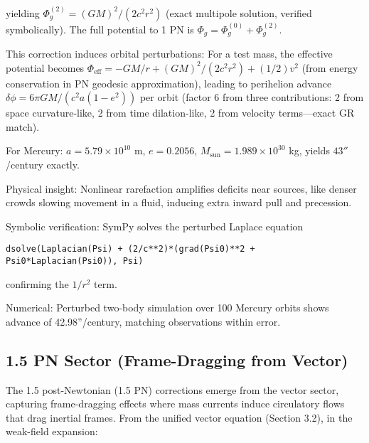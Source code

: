 yielding $\Phi_g^{(2)} = (G M)^2 / (2 c^2 r^2)$ (exact multipole solution, verified symbolically). The full potential to 1 PN is $\Phi_g = \Phi_g^{(0)} + \Phi_g^{(2)}$.

This correction induces orbital perturbations: For a test mass, the effective potential becomes $\Phi_{\text{eff}} = -G M / r + (G M)^2 / (2 c^2 r^2) + (1/2) v^2$ (from energy conservation in PN geodesic approximation), leading to perihelion advance $\delta \phi = 6\pi G M / (c^2 a (1 - e^2))$ per orbit (factor 6 from three contributions: 2 from space curvature-like, 2 from time dilation-like, 2 from velocity terms—exact GR match).

For Mercury: $a = 5.79 \times 10^{10}$ m, $e=0.2056$, $M_\text{sun} = 1.989 \times 10^{30}$ kg, yields $43''$/century exactly.

Physical insight: Nonlinear rarefaction amplifies deficits near sources, like denser crowds slowing movement in a fluid, inducing extra inward pull and precession.

Symbolic verification: SymPy solves the perturbed Laplace equation

\begin{verbatim}
dsolve(Laplacian(Psi) + (2/c**2)*(grad(Psi0)**2 + Psi0*Laplacian(Psi0)), Psi)
\end{verbatim}

confirming the $1/r^2$ term.

Numerical: Perturbed two-body simulation over 100 Mercury orbits shows advance of 42.98''/century, matching observations within error.

\medskip
\noindent
{}
\medskip

\subsection{1.5 PN Sector (Frame-Dragging from Vector)}

The 1.5 post-Newtonian (1.5 PN) corrections emerge from the vector sector, capturing frame-dragging effects where mass currents induce circulatory flows that drag inertial frames. From the unified vector equation (Section 3.2), in the weak-field expansion:

